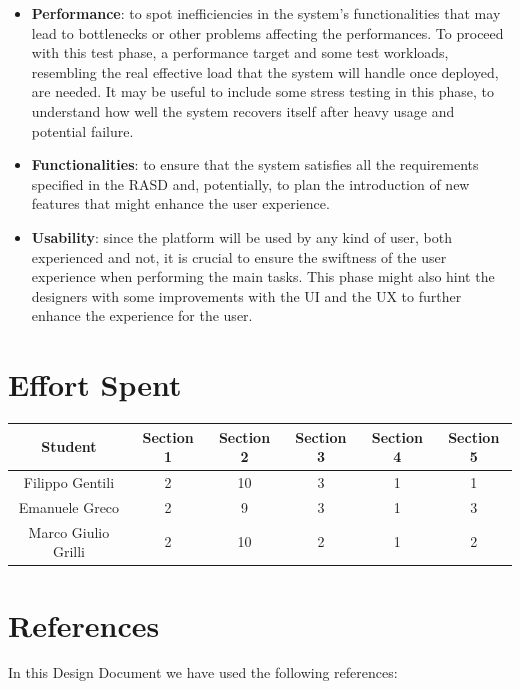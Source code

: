 \documentclass[12pt,oneside,a4paper]{article}
\begin{document}
\clearpage

\begin{itemize}
    \item \textbf{Performance}: to spot inefficiencies in the system's functionalities that may lead to bottlenecks or other problems affecting the performances. To proceed with this test phase, a performance target and some test workloads, resembling the real effective load that the system will handle once deployed, are needed. It may be useful to include some stress testing in this phase, to understand how well the system recovers itself after heavy usage and potential failure.
    \item \textbf{Functionalities}: to ensure that the system satisfies all the requirements specified in the RASD and, potentially, to plan the introduction of new features that might enhance the user experience.
    \item \textbf{Usability}: since the platform will be used by any kind of user, both experienced and not, it is crucial to ensure the swiftness of the user experience when performing the main tasks. This phase might also hint the designers with some improvements with the UI and the UX to further enhance the experience for the user.
\end{itemize}

\clearpage

\section{Effort Spent}

\begin{table}[H]
    \centering
    \begin{tabular}{|c|c|c|c|c|c|}
    \hline
    \textbf{Student} & \textbf{Section 1} & \textbf{Section 2} & \textbf{Section 3} & \textbf{Section 4}  & \textbf{Section 5}\\
    \hline
    Filippo Gentili & 2 & 10 & 3 & 1 & 1\\
    \hline
    Emanuele Greco & 2 & 9 & 3 & 1 & 3\\
    \hline
    Marco Giulio Grilli & 2 & 10 & 2 & 1 & 2\\
    \hline
    \end{tabular}
\end{table}

\section{References}
In this Design Document we have used the following references:
\end{document}
